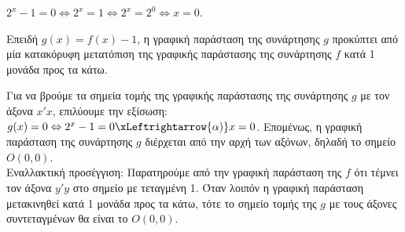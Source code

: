 \begin{alist}
\item $2^x - 1 = 0 \Leftrightarrow 2^x = 1 \Leftrightarrow 2^x = 2^0 \Leftrightarrow x = 0$.
\item 
\begin{rlist}
\item Επειδή $g(x) = f(x) - 1$, η γραφική παράσταση της συνάρτησης $g$ προκύπτει από μία κατακόρυφη μετατόπιση της γραφικής παράστασης της συνάρτησης $f$ κατά 1 μονάδα προς τα κάτω.
\item Για να βρούμε τα σημεία τομής της γραφικής παράστασης της συνάρτησης $g$ με τον άξονα $x'x$, επιλύουμε την εξίσωση: $g(x) = 0 \Leftrightarrow 2^x - 1 = 0 \xLeftrightarrow{\alpha)} x = 0$. Επομένως, η γραφική παράσταση της συνάρτησης $g$ διέρχεται από την αρχή των αξόνων, δηλαδή το σημείο $O(0, 0)$. \\
Εναλλακτική προσέγγιση: Παρατηρούμε από την γραφική παράσταση της $f$ ότι τέμνει τον άξονα $y'y$ στο σημείο με τεταγμένη 1. Όταν λοιπόν η γραφική παράσταση μετακινηθεί κατά 1 μονάδα προς τα κάτω, τότε το σημείο τομής της $g$ με τους άξονες συντεταγμένων θα είναι το $O(0, 0)$.
\end{rlist}
\end{alist}
\begin{center}
\end{center}


